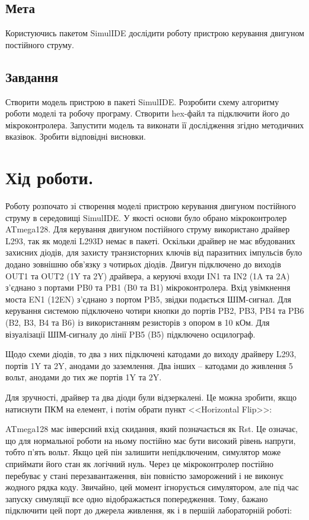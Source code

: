 \documentclass[14pt, a4paper]{extreport}
\begin{document}
	\subsection*{Мета} 
	Користуючись пакетом SimulIDE дослідити роботу пристрою керування двигуном постійного струму.
	
	\subsection*{Завдання}
	Створити модель пристрою в пакеті SimulIDE. Розробити схему алгоритму роботи моделі та робочу програму. Створити hex-файл та підключити його до мікроконтролера. Запустити модель та виконати її дослідження згідно методичних вказівок. Зробити відповідні висновки.
	
	\section*{Хід роботи.}
	
	Роботу розпочато зі створення моделі пристрою керування двигуном постійного струму в середовищі SimulIDE. У якості основи було обрано мікроконтролер ATmega128. Для керування двигуном постійного струму використано драйвер L293, так як моделі L293D немає в пакеті. Оскільки драйвер не має вбудованих захисних діодів, для захисту транзисторних ключів від паразитних імпульсів було додано зовнішню обв'язку з чотирьох діодів. Двигун підключено до виходів OUT1 та OUT2 (1Y та 2Y) драйвера, а керуючі входи IN1 та IN2 (1A та 2A) з'єднано з портами PB0 та PB1 (B0 та B1) мікроконтролера. Вхід увімкнення моста EN1 (12EN) з'єднано з портом PB5, звідки подається ШІМ-сигнал. Для керування системою підключено чотири кнопки до портів PB2, PB3, PB4 та PB6 (B2, B3, B4 та B6) із використанням  резисторів з опором в 10 кОм. Для візуалізації ШІМ-сигналу до лінії PB5 (B5) підключено осцилограф.
	
	
	Щодо схеми діодів, то два з них підключені катодами до виходу драйверу L293, портів 1Y та 2Y, анодами до заземлення. Два інших -- катодами до живлення 5 вольт, анодами до тих же портів 1Y та 2Y.
	
	Для зручності, драйвер та два діоди були відзеркалені. Це можна зробити, якщо натиснути ПКМ на елемент, і потім обрати пункт <<Horizontal Flip>>:
	
	
	ATmega128 має інверсний вхід скидання, який позначається як Rst. Це означає, що для нормальної роботи на ньому постійно має бути високий рівень напруги, тобто п'ять вольт. Якщо цей пін залишити непідключеним, симулятор може сприймати його стан як логічний нуль. Через це мікроконтролер постійно перебуває у стані перезавантаження, він повністю заморожений і не виконує жодного рядка коду. Звичайно, цей момент ігнорується симулятором, але під час запуску симуляції все одно відображається попередження. Тому, бажано підключити цей порт до джерела живлення, як і в першій лабораторній роботі:
	
\end{document}
